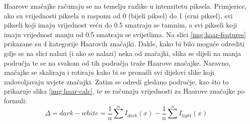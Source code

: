 Haarove značajke računaju se na temelju razlike u intenzitetu piksela. Primjerice, ako su vrijednosti piksela u rasponu od 0 (bijeli piksel) do 1 (crni piksel), svi pikseli koji imaju vrijednost veću do 0.5 smatraju se tamnim, a svi pikseli koji imaju vrijednost manju od 0.5 smatraju se svijetlima. Na slici \ref{img:haar-features} prikazane su 4 kategorije Haarovih značajki. Dakle, kako bi bilo moguće odrediti gdje se na slici nalazi (i ako se nalazi) neka od značajki, slika se dijeli na manja područja te se na svakom od tih područja traže Haarove značajke. Naravno, značajke se skaliraju i rotiraju kako bi se pronašli svi dijelovi slike koji zadovoljavaju uvjete značajki. Zatim se odredi gledano područje, kao što to prikazuje slika \ref{img:haar-calc}, te se računaju vrijednosti za Haarove značajke po formuli:
\[
\Delta = dark - white = \frac{1}{n}\sum_{}^{n}I_{dark}(x) - \frac{1}{n}\sum_{}^{n}I_{light}(x)
\]

